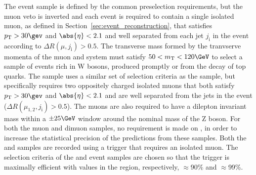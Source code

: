 The \mj event sample is defined by the common preselection
requirements, but the muon veto is inverted and each event is required
to contain a single isolated muon, as defined in
Section~\ref{sec:event_reconstruction}, that satisfies $\Pt > 30\gev$
and $\abs{\eta} < 2.1$ and well separated from each jet $j_{\text{i}}$
in the event according to $\Delta R(\mu,j_{\text{i}}) > 0.5$.
The transverse mass formed by the tranvserve momenta of the muon and
\ptvecmiss system must satisfy $50 < m_\text{T} < 120\GeV$ to select a
sample of events rich in W bosons, produced promptly or from the decay
of top quarks. The \mmj sample uses a similar set of selection
criteria as the \mj sample, but specifically requires two oppositely
charged isolated muons that both satisfy $\Pt > 30\gev$ and
$\abs{\eta} < 2.1$ and are well separated from the jets in the event
($\Delta R(\mu_{1,2},j_{\text{i}}) > 0.5$). The muons are also
required to have a dilepton invariant mass within a $\pm 25\GeV$
window around the nominal mass of the Z boson. For both the muon and
dimuon samples, no requirement is made on \alphat, in order to
increase the statistical precision of the predictions from these
samples. Both the \mj and \mmj samples are recorded using a trigger
that requires an isolated muon. The selection criteria of the \mj and
\mmj event samples are chosen so that the trigger is maximally
efficient with values in the region, respectively, $\approx$90\% and
$\approx$99\%.
